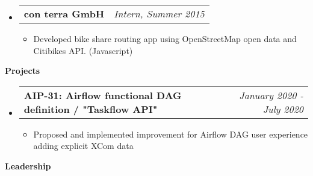 \documentclass[letterpaper,10pt]{article}
\makeatletter
\newcommand{\resitem}[1]{\item #1 \vspace{-2pt}}
\newcommand{\resheading}[1]{{\large \colorbox{mygrey}{\begin{minipage}{\textwidth}{\textbf{#1 \vphantom{p\^{E}}}}\end{minipage}}}}
\newcommand{\ressubheading}[4]{
\begin{tabular*}{7.0in}{l@{\extracolsep{\fill}}r}
		\textbf{#1} & \textit{#4} \\
\end{tabular*}\vspace{-6pt}}
\makeatother
\begin{document}
\begin{itemize}
		\item
			\ressubheading{con terra GmbH}{Münster, Germany}{Intern}{Intern, Summer 2015}
			\begin{itemize}
				\resitem{Developed bike share routing app using OpenStreetMap open data and Citibikes API. (Javascript)}
			\end{itemize}
	\end{itemize}

\resheading{Projects}
	\begin{itemize}
		\item
			\ressubheading{
AIP-31: Airflow functional DAG definition / "Taskflow API"}{Boulder, CO, USA}{ML Engineer}{January 2020 - July 2020}
			\begin{itemize}
				\resitem{Proposed and implemented improvement for Airflow DAG user experience adding explicit XCom data }
			\end{itemize}
	\end{itemize}

\resheading{Leadership}
	
\end{document}
